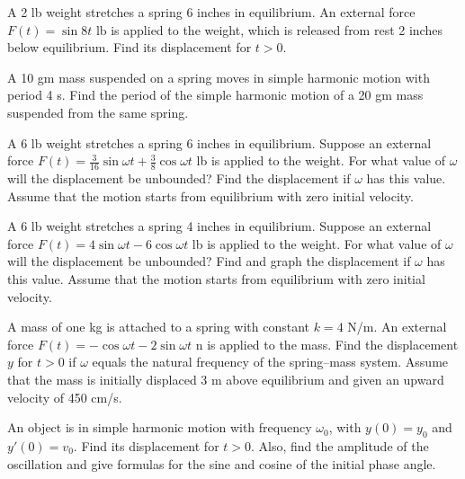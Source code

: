 \documentclass{ximera}
\begin{document}
\begin{problem}\label{exer:6.1.13}
A 2 lb weight stretches a spring 6 inches in equilibrium.  An external
force $F(t)=\sin8t$ lb is applied to the weight, which is released
from rest 2 inches below equilibrium. Find its displacement
for $t>0$.
\end{problem}

\begin{problem}\label{exer:6.1.14}
A 10 gm mass suspended on a spring moves in simple harmonic
motion with period 4 s.  Find the period of the simple
harmonic motion of a 20 gm mass suspended from the same spring.
\end{problem}

\begin{problem}\label{exer:6.1.15}
A 6 lb weight stretches a spring 6 inches in equilibrium. Suppose
an external force $F(t)=\frac{3}{16}\sin\omega
t+\frac{3}{8}\cos\omega t $ lb is applied to the weight. For what
value
of $\omega$ will the displacement be unbounded? Find the displacement
if $\omega$ has this value. Assume that the motion starts from
equilibrium with zero initial velocity.
\end{problem}

\begin{problem}\label{exer:6.1.16} 
A 6 lb weight stretches a spring 4 inches in equilibrium. Suppose
an external force $ F(t)=4\sin\omega t-6\cos\omega t $ lb is applied
to the weight. For what value of $\omega$ will the displacement be
unbounded? Find and graph the displacement if $\omega$ has this value.
Assume that the motion starts from equilibrium with zero initial
velocity.
\end{problem}

\begin{problem}\label{exer:6.1.17}
A mass of one kg is attached to a spring with constant $k=4$ N/m. An
external force $F(t)=-\cos\omega t-2\sin\omega t$ n is applied to the
mass. Find the displacement $y$ for $t>0$ if $\omega$ equals the
natural frequency of the spring--mass system. Assume that the
mass is initially displaced 3 m above equilibrium and given an upward
velocity of 450 cm/s.
\end{problem}

\begin{problem}\label{exer:6.1.18}
An object is in simple harmonic motion
with frequency $\omega_0$, with $y(0)=y_0$ and $y'(0)=v_0$. Find
its displacement for $t>0$. Also, find the amplitude of the
oscillation and give formulas for the sine and cosine of the initial
phase angle.
\end{problem}
\end{document}
